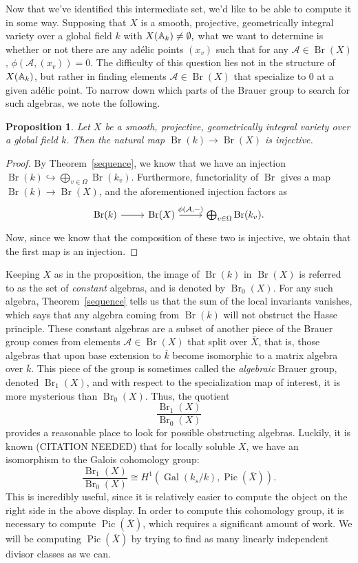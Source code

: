 \documentclass[12pt,twoside]{reedthesis}
\theoremstyle{plain}
\newtheorem{proposition}[theorem]{Proposition}
\theoremstyle{definition}
\theoremstyle{remark}
\newcommand{\Affine}{\mathbb{A}}
\newcommand{\calA}{\mathcal{A}}
\newcommand{\Br}{\operatorname{Br}}
\newcommand{\Pic}{\operatorname{Pic}}
\newcommand{\adele}{\reflectbox{$\Affine$}}
\newcommand{\Gal}{\operatorname{Gal}}
\begin{document}
Now that we've identified this intermediate set, we'd like to be able to compute it in some way. Supposing that $X$ is a smooth, projective, geometrically integral variety over a global field $k$ with $X(\adele_k)\neq\emptyset,$ what we want to determine is whether or not there are any ad\'elic points $(x_v)$ such that for any $\calA\in\Br(X)$, $\phi(\calA,(x_v))=0$. The difficulty of this question lies not in the structure of $X(\adele_k)$, but rather in finding elements $\calA\in\Br(X)$ that specialize to 0 at a given ad\'elic point. To narrow down which parts of the Brauer group to search for such algebras, we note the following.
\begin{proposition}
Let $X$ be a smooth, projective, geometrically integral variety over a global field $k$. Then the natural map $\Br(k)\to\Br(X)$ is injective.
\end{proposition}
\begin{proof}
By Theorem~\ref{sequence}, we know that we have an injection $\Br(k)\hookrightarrow\bigoplus_{v\in\Omega}\Br(k_v)$. Furthermore, functoriality of $\Br$ gives a map $\Br(k)\to\Br(X)$, and the aforementioned injection factors as
\[ 
\begin{tikzcd}
\Br(k)\ar{r}&\Br(X)\ar{r}{\phi(\calA,-)}&\bigoplus_{v\in\Omega}\Br(k_v).
\end{tikzcd}
\]
Now, since we know that the composition of these two is injective, we obtain that the first map is an injection.
\end{proof}
\noindent Keeping $X$ as in the proposition, the image of $\Br(k)$ in $\Br(X)$ is referred to as the set of \emph{constant} algebras, and is denoted by $\Br_0(X)$. For any such algebra, Theorem~\ref{sequence} tells us that the sum of the local invariants vanishes, which says that any algebra coming from $\Br(k)$ will not obstruct the Hasse principle. These constant algebras are a subset of another piece of the Brauer group comes from elements $\calA\in\Br(X)$ that split over $\overline{X}$, that is, those algebras that upon base extension to $\overline{k}$ become isomorphic to a matrix algebra over $\overline{k}$. This piece of the group is sometimes called the \emph{algebraic} Brauer group, denoted $\Br_1(X)$, and with respect to the specialization map of interest, it is more mysterious than $\Br_0(X)$. Thus, the quotient \[\frac{\Br_1(X)}{\Br_0(X)}\] provides a reasonable place to look for possible obstructing algebras. Luckily, it is known (CITATION NEEDED) that for locally soluble $X$, we have an isomorphism to the Galois cohomology group:
\[
\frac{\Br_1(X)}{\Br_0(X)}\cong H^1(\Gal(k_s/k),\Pic(\overline{X})).
\]
This is incredibly useful, since it is relatively easier to compute the object on the right side in the above display. In order to compute this cohomology group, it is necessary to compute $\Pic(\overline{X})$, which requires a significant amount of work. We will be computing $\Pic(\overline{X})$ by trying to find as many linearly independent divisor classes as we can.
\end{document}
